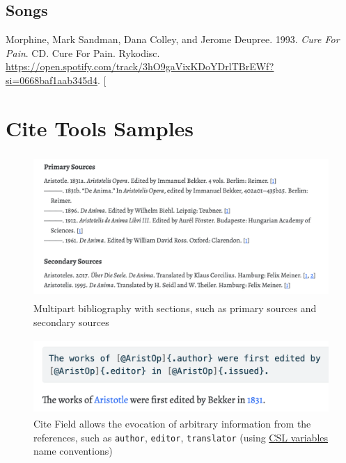 \documentclass[
  12pt,
  a4paper,
  oneside,
  numbers=noenddot,
  titlepage,
  toclink=all,
  toc=bibliography]{scrbook}
\newlength{\cslhangindent}
\newlength{\cslentryspacingunit} %
\newenvironment{CSLReferences}[2] %
 {%
  \setlength{\parindent}{0pt}
  \ifodd #1
  \let\oldpar\par
  \def\par{\hangindent=\cslhangindent\oldpar}
  \fi
  \setlength{\parskip}{#2\cslentryspacingunit}
 }%
 {}
\theoremstyle{definition}
\theoremstyle{definition}
\theoremstyle{definition}
\theoremstyle{plain}
\theoremstyle{plain}
\theoremstyle{plain}
\theoremstyle{plain}
\theoremstyle{plain}
\theoremstyle{remark}
\begin{document}
\hypertarget{sec-scriv164}{%
\section{Songs}\label{sec-scriv164}}

\hypertarget{refs_scriv164}{}
\begin{CSLReferences}{1}{0}
\leavevmode{}%
Morphine, Mark Sandman, Dana Colley, and Jerome Deupree. 1993.
\emph{Cure For Pain}. CD. Cure For Pain. Rykodisc.
\url{https://open.spotify.com/track/3hO9gaVixKDoYDrlTBrEWf?si=0668baf1aab345d4}.
{[}\Acrobatmenu{GoBack}{$\hookleftarrow$}{]}

\end{CSLReferences}

\hypertarget{sec-scriv165}{%
\chapter*{Cite Tools Samples}\label{sec-scriv165}}

\protect\hypertarget{scriv165}{}{}

\begin{figure}

{\centering \includegraphics[width=4.70833in,height=2.15625in]{multipartbibliography.png}

}

\caption{\label{fig-scriv165A}Multipart bibliography with sections, such
as primary sources and secondary sources}

\end{figure}

\begin{figure}

{\centering \includegraphics[width=4.75in,height=1.125in]{citefield.png}

}

\caption{\label{fig-scriv165B}Cite Field allows the evocation of
arbitrary information from the references, such as \texttt{author},
\texttt{editor}, \texttt{translator} (using
\href{https://docs.citationstyles.org/en/stable/specification.html\#appendix-iv-variables}{CSL
variables} name conventions)}

\end{figure}
\end{document}
